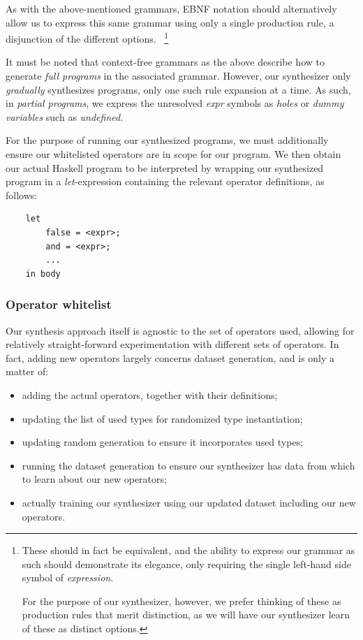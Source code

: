 \documentclass{article}
\begin{document}
As with the above-mentioned grammars,
EBNF notation should alternatively allow us to express
this same grammar using only a single production rule,
a disjunction of the different options.%
~\footnote{
    These should in fact be equivalent,
    and the ability to express our grammar as such should demonstrate its elegance,
    only requiring the single left-hand side symbol of \emph{expression}.

    For the purpose of our synthesizer, however,
    we prefer thinking of these as production rules that merit distinction,
    as we will have our synthesizer learn of these as distinct options.
}

It must be noted that context-free grammars
as the above
describe how to generate \emph{full programs} in the associated grammar.
However, our synthesizer only \emph{gradually} synthesizes programs,
only one such rule expansion at a time.
As such, in \emph{partial programs},
we express the unresolved \emph{expr} symbols as
\emph{holes} or \emph{dummy variables} such as \emph{undefined}.

For the purpose of running our synthesized programs,
we must additionally ensure our whitelisted operators are in scope for our program.
We then obtain our actual Haskell program to be interpreted
by wrapping our synthesized program in a \emph{let}-expression
containing the relevant operator definitions, as follows:

\begin{verbatim}
    let
        false = <expr>;
        and = <expr>;
        ...
    in body
\end{verbatim}

\subsubsection{Operator whitelist}

Our synthesis approach itself is agnostic to the set of operators used,
allowing for relatively straight-forward experimentation with different sets of operators.
In fact, adding new operators largely concerns dataset generation, and is only a matter of:
\begin{itemize}
    \item adding the actual operators, together with their definitions;
    \item updating the list of used types for randomized type instantiation;
    \item updating random generation to ensure it incorporates used types;
    \item running the dataset generation to ensure our synthesizer has data from which to learn about our new operators;
    \item actually training our synthesizer using our updated dataset including our new operators.
\end{itemize}
\end{document}

